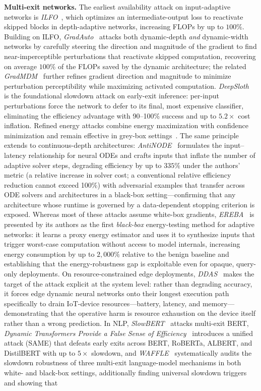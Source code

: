\documentclass[acmsmall,screen,review,nonacm]{acmart}
\begin{document}
\noindent\textbf{Multi-exit networks.}
The earliest availability attack on input-adaptive networks is \emph{ILFO}~\cite{haque2020ilfo}, which optimizes an intermediate-output loss to reactivate skipped blocks in depth-adaptive networks, increasing FLOPs by up to $100\%$. Building on ILFO, \emph{GradAuto}~\cite{pan2022gradauto} attacks both dynamic-depth \emph{and} dynamic-width networks by carefully steering the direction and magnitude of the gradient to find near-imperceptible perturbations that reactivate skipped computation, recovering on average $100\%$ of the FLOPs saved by the dynamic architecture; the related \emph{GradMDM}~\cite{pan2023gradmdm} further refines gradient direction and magnitude to minimize perturbation perceptibility while maximizing activated computation. \emph{DeepSloth}~\cite{hong2021deepsloth} is the foundational slowdown attack on early-exit inference: per-input perturbations force the network to defer to its final, most expensive classifier, eliminating the efficiency advantage with 90--100\% success and up to $5.2\times$ cost inflation. Refined energy attacks combine energy maximization with confidence minimization and remain effective in grey-box settings~\cite{du2024energy}. The same principle extends to continuous-depth architectures: \emph{AntiNODE}~\cite{haque2023antinode} formulates the input--latency relationship for neural ODEs and crafts inputs that inflate the number of adaptive solver steps, degrading efficiency by up to $335\%$ under the authors' metric (a relative increase in solver cost; a conventional relative efficiency reduction cannot exceed 100\%) with adversarial examples that transfer across ODE solvers and architectures in a black-box setting---confirming that any architecture whose runtime is governed by a data-dependent stopping criterion is exposed. Whereas most of these attacks assume white-box gradients, \emph{EREBA}~\cite{haque2022ereba} is presented by its authors as the first \emph{black-box} energy-testing method for adaptive networks: it learns a proxy energy estimator and uses it to synthesize inputs that trigger worst-case computation without access to model internals, increasing energy consumption by up to $2{,}000\%$ relative to the benign baseline and establishing that the energy-robustness gap is exploitable even for opaque, query-only deployments. On resource-constrained edge deployments, \emph{DDAS}~\cite{ayyat2025tricking} makes the target of the attack explicit at the system level: rather than degrading accuracy, it forces edge dynamic neural networks onto their longest execution path specifically to drain IoT-device resources---battery, latency, and memory---demonstrating that the operative harm is resource exhaustion on the device itself rather than a wrong prediction. In NLP, \emph{SlowBERT}~\cite{zhang2023slowbert} attacks multi-exit BERT, \emph{Dynamic Transformers Provide a False Sense of Efficiency}~\cite{chen2023dynamic} introduces a unified attack (SAME) that defeats early exits across BERT, RoBERTa, ALBERT, and DistilBERT with up to $5\times$ slowdown, and \emph{WAFFLE}~\cite{coalson2023waffle} systematically audits the slowdown robustness of three multi-exit language-model mechanisms in both white- and black-box settings, additionally finding universal slowdown triggers and showing that 
\end{document}
